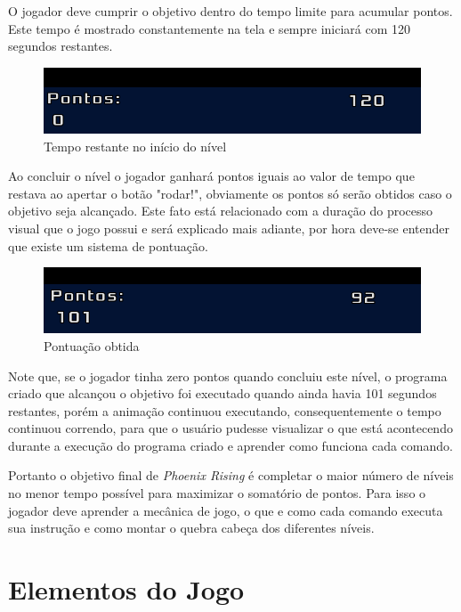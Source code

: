 O jogador deve cumprir o objetivo dentro do tempo limite para acumular pontos.
Este tempo é mostrado constantemente na tela e sempre iniciará com 120 segundos
restantes.

\begin{figure}[H]
    \includegraphics[scale=0.3]{../figuras/tempo_restante.png}
    \caption{Tempo restante no início do nível}
\end{figure}

Ao concluir o nível o jogador ganhará pontos iguais ao valor de tempo que 
restava ao apertar o botão "rodar!", obviamente os pontos só serão obtidos caso
o objetivo seja alcançado. Este fato está relacionado com a duração do processo 
visual que o jogo possui e será explicado mais adiante, por hora deve-se 
entender que existe um sistema de pontuação.

\begin{figure}[H]
    \includegraphics[scale=0.3]{../figuras/pontuacao.png}
    \caption{Pontuação obtida}
\end{figure}

Note que, se o jogador tinha zero pontos quando concluiu este nível, o programa
criado que alcançou o objetivo foi executado quando ainda havia 101 segundos
restantes, porém a animação continuou executando, consequentemente o tempo
continuou correndo, para que o usuário
pudesse visualizar o que está acontecendo durante a execução do programa criado
e aprender como funciona cada comando.

Portanto o objetivo final de \textit{Phoenix Rising} é completar o maior número
de níveis no menor tempo possível para maximizar o somatório de pontos. Para 
isso o jogador deve aprender a mecânica de jogo, o que  e como cada comando
executa sua instrução e como montar o quebra cabeça dos diferentes níveis.

\section{Elementos do Jogo}
\label{sec:consideracoes_preliminares}

